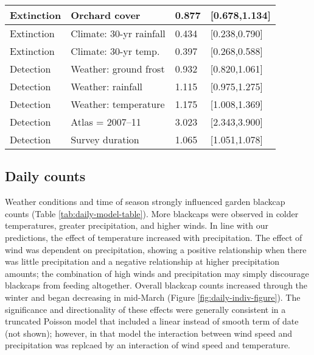 \documentclass[a4paper, nobind]{templates/ociamthesis}
\begin{document}
\begin{longtable}{l|l|l|l}
\hline
Extinction & Orchard cover & 0.877 & [0.678,1.134]\\
\hline
Extinction & Climate: 30-yr rainfall & 0.434 & [0.238,0.790]\\
\hline
Extinction & Climate: 30-yr temp. & 0.397 & [0.268,0.588]\\
\hline
Detection & Weather: ground frost & 0.932 & [0.820,1.061]\\
\hline
Detection & Weather: rainfall & 1.115 & [0.975,1.275]\\
\hline
Detection & Weather: temperature & 1.175 & [1.008,1.369]\\
\hline
Detection & Atlas = 2007–11 & 3.023 & [2.343,3.900]\\
\hline
Detection & Survey duration & 1.065 & [1.051,1.078]\\
\hline
\end{longtable}
\endgroup{}

\hypertarget{daily-counts-1}{%
\subsection{Daily counts}\label{daily-counts-1}}

Weather conditions and time of season strongly influenced garden blackcap counts (Table \ref{tab:daily-model-table}). More blackcaps were observed in colder temperatures, greater precipitation, and higher winds. In line with our predictions, the effect of temperature increased with precipitation. The effect of wind was dependent on precipitation, showing a positive relationship when there was little precipitation and a negative relationship at higher precipitation amounts; the combination of high winds and precipitation may simply discourage blackcaps from feeding altogether. Overall blackcap counts increased through the winter and began decreasing in mid-March (Figure \ref{fig:daily-indiv-figure}). The significance and directionality of these effects were generally consistent in a truncated Poisson model that included a linear instead of smooth term of date (not shown); however, in that model the interaction between wind speed and precipitation was replcaed by an interaction of wind speed and temperature.
\end{document}
